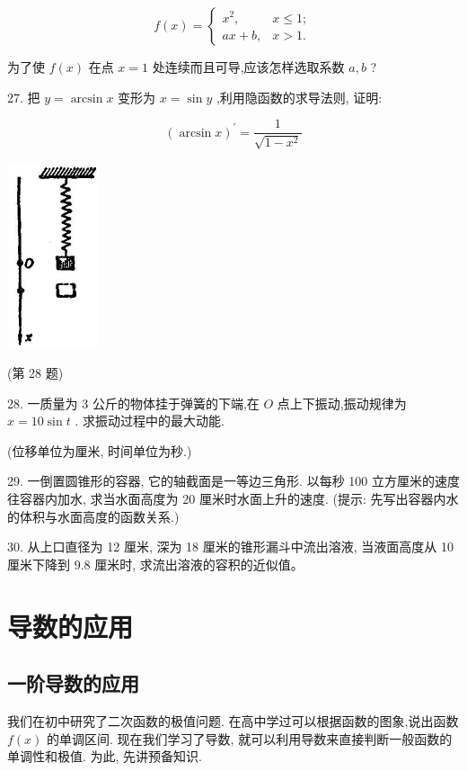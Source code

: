 \documentclass[lang=cn,newtx,12pt,scheme=chinese]{elegantbook}
\begin{document}
\[
f\left( x\right) = \left\{ \begin{array}{ll} {x}^{2}, & x \leq 1; \\ {ax} + b, & x > 1. \end{array}\right.
\]

为了使 \(f\left( x\right)\) 在点 \(x = 1\) 处连续而且可导,应该怎样选取系数 \(a,b\) ?

27. 把 \(y = \arcsin x\) 变形为 \(x = \sin y\) ,利用隐函数的求导法则, 证明:

\[
{\left( \arcsin x\right) }^{\prime } = \frac{1}{\sqrt{1 - {x}^{2}}}
\]

\begin{center}
\includegraphics[max width=0.2\textwidth]{images/01912c18-5c3f-733d-b775-749ba9897a9d_129_320008.jpg}
\end{center}

(第 28 题)

28. 一质量为 3 公斤的物体挂于弹簧的下端,在 \(O\) 点上下振动,振动规律为 \(x = {10}\sin t\) . 求振动过程中的最大动能.

(位移单位为厘米, 时间单位为秒.)

29. 一倒置圆锥形的容器, 它的轴截面是一等边三角形. 以每秒 100 立方厘米的速度往容器内加水, 求当水面高度为 20 厘米时水面上升的速度. (提示: 先写出容器内水的体积与水面高度的函数关系.)

30. 从上口直径为 12 厘米, 深为 18 厘米的锥形漏斗中流出溶液, 当液面高度从 10 厘米下降到 9.8 厘米时, 求流出溶液的容积的近似值。

\chapter{导数的应用}

\section*{一阶导数的应用}

我们在初中研究了二次函数的极值问题. 在高中学过可以根据函数的图象,说出函数 \(f\left( x\right)\) 的单调区间. 现在我们学习了导数, 就可以利用导数来直接判断一般函数的单调性和极值. 为此, 先讲预备知识.
\end{document}

